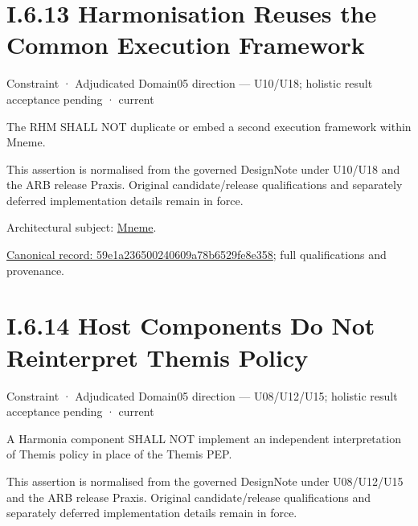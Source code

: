 \section*{I.6.13 Harmonisation Reuses the Common Execution Framework}
\label{navigation:I.6.13}

\label{element:59e1a236500240609a78b6529fe8e358}
{\small Constraint · Adjudicated Domain05 direction — U10/U18; holistic result acceptance pending · current}\par

The RHM SHALL NOT duplicate or embed a second execution framework within Mneme.



This assertion is normalised from the governed DesignNote under U10/U18 and the ARB release Praxis. Original candidate/release qualifications and separately deferred implementation details remain in force.



Architectural subject: \hyperref[element:1af8a56358f7429fabfb57be66542a99]{Mneme}.


{\footnotesize \href{../../../../../../../continuum/motivation/constraint/59e1a236500240609a78b6529fe8e358.md}{Canonical record: 59e1a236500240609a78b6529fe8e358}; full qualifications and provenance.}\par
\section*{I.6.14 Host Components Do Not Reinterpret Themis Policy}
\label{navigation:I.6.14}

\label{element:80e5d019948b4c16acb510547d7a3ac6}
{\small Constraint · Adjudicated Domain05 direction — U08/U12/U15; holistic result acceptance pending · current}\par

A Harmonia component SHALL NOT implement an independent interpretation of Themis policy in place of the Themis PEP.



This assertion is normalised from the governed DesignNote under U08/U12/U15 and the ARB release Praxis. Original candidate/release qualifications and separately deferred implementation details remain in force.



